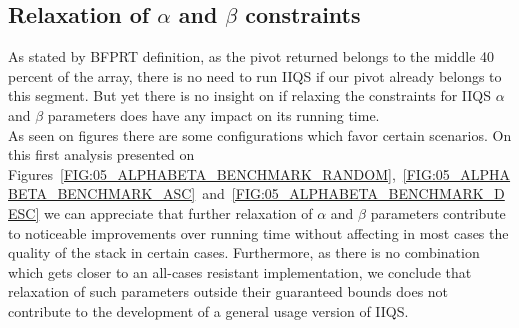 \subsection{Relaxation of $\alpha$ and $\beta$ constraints}

As stated by BFPRT definition, as the pivot returned belongs to the middle 40 percent of the array, there is no need to run IIQS if our pivot already belongs to this segment. But yet there is no insight on if relaxing the constraints for IIQS $\alpha$ and $\beta$ parameters does have any impact on its running time.\\

As seen on figures there are some configurations which favor certain scenarios. On this first analysis presented on Figures~\ref{FIG:05_ALPHABETA_BENCHMARK_RANDOM},~\ref{FIG:05_ALPHABETA_BENCHMARK_ASC}~and~\ref{FIG:05_ALPHABETA_BENCHMARK_DESC} we can appreciate that further relaxation of $\alpha$ and $\beta$ parameters contribute to noticeable improvements over running time without affecting in most cases the quality of the stack in certain cases. Furthermore, as there is no combination which gets closer to an all-cases resistant implementation, we conclude that relaxation of such parameters outside their guaranteed bounds does not contribute to the development of a general usage version of IIQS.\\





